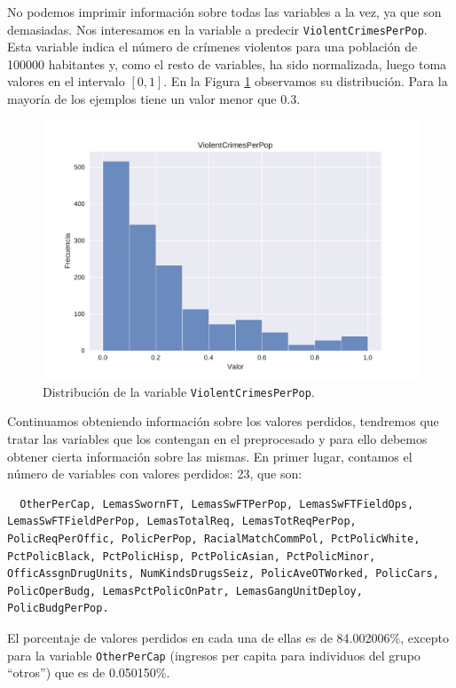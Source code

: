 \documentclass[a4paper, 20pt]{article}
\begin{document}
No podemos imprimir información sobre todas las variables a la vez, ya que son demasiadas. Nos interesamos en la variable a predecir \texttt{ViolentCrimesPerPop}. Esta variable indica el número de crímenes violentos para una población de 100000 habitantes y, como el resto de variables, ha sido normalizada, luego toma valores en el intervalo $[0,1]$. En la Figura \ref{fig:histVCPP} observamos su distribución. Para la mayoría de los ejemplos tiene un valor menor que 0.3.

\begin{figure}[H]
    \centering
    \includegraphics[width=\textwidth]{HistViolentCrimesPerPop}
    \caption{Distribución de la variable \texttt{ViolentCrimesPerPop}.}
    \label{fig:histVCPP}
\end{figure}

Continuamos obteniendo información sobre los valores perdidos, tendremos que tratar las variables que los contengan en el preprocesado y para ello debemos obtener cierta información sobre las mismas. En primer lugar, contamos el número de variables con valores perdidos: 23, que son:

\begin{lstlisting}
  OtherPerCap, LemasSwornFT, LemasSwFTPerPop, LemasSwFTFieldOps, LemasSwFTFieldPerPop, LemasTotalReq, LemasTotReqPerPop, PolicReqPerOffic, PolicPerPop, RacialMatchCommPol, PctPolicWhite, PctPolicBlack, PctPolicHisp, PctPolicAsian, PctPolicMinor, OfficAssgnDrugUnits, NumKindsDrugsSeiz, PolicAveOTWorked, PolicCars, PolicOperBudg, LemasPctPolicOnPatr, LemasGangUnitDeploy, PolicBudgPerPop.
\end{lstlisting}

El porcentaje de valores perdidos en cada una de ellas es de 84.002006\%, excepto para la variable \texttt{OtherPerCap} (ingresos per capita para individuos del grupo ``otros'')  que es de 0.050150\%.
\end{document}
